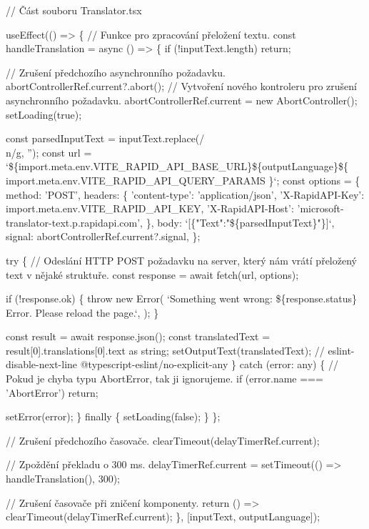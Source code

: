 \begin{prog}
// Část souboru Translator.tsx

useEffect(() => \{
  // Funkce pro zpracování přeložení textu.
  const handleTranslation = async () => \{
    if (!inputText.length) return;

    // Zrušení předchozího asynchronního požadavku.
    abortControllerRef.current?.abort();
    // Vytvoření nového kontroleru pro zrušení asynchronního požadavku.
    abortControllerRef.current = new AbortController();
    setLoading(true);

    const parsedInputText = inputText.replace(/\\n/g, '');
    const url = `\$\{import.meta.env.VITE_RAPID_API_BASE_URL\}\$\{outputLanguage\}\$\{
      import.meta.env.VITE_RAPID_API_QUERY_PARAMS
    \}`;
    const options = \{
      method: 'POST',
      headers: \{
        'content-type': 'application/json',
        'X-RapidAPI-Key': import.meta.env.VITE_RAPID_API_KEY,
        'X-RapidAPI-Host': 'microsoft-translator-text.p.rapidapi.com',
      \},
      body: `[\{"Text":"\$\{parsedInputText\}"\}]`,
      signal: abortControllerRef.current?.signal,
    \};

    try \{
      // Odeslání HTTP POST požadavku na server, 
        který nám vrátí přeložený text v nějaké struktuře.
      const response = await fetch(url, options);

      if (!response.ok) \{
        throw new Error(
          `Something went wrong: \$\{response.status\} Error.
          Please reload the page.`,
        );
      \}

      const result = await response.json();
      const translatedText = result[0].translations[0].text as string;
      setOutputText(translatedText);
      // eslint-disable-next-line @typescript-eslint/no-explicit-any
    \} catch (error: any) \{
      // Pokud je chyba typu AbortError, tak ji ignorujeme.
      if (error.name === 'AbortError') return;

      setError(error);
    \} finally \{
      setLoading(false);
    \}
  \};

  // Zrušení předchozího časovače.
  clearTimeout(delayTimerRef.current);

  // Zpoždění překladu o 300 ms.
  delayTimerRef.current = setTimeout(() => handleTranslation(), 300);

  // Zrušení časovače při zničení komponenty.
  return () => clearTimeout(delayTimerRef.current);
\}, [inputText, outputLanguage]);
\end{prog}

